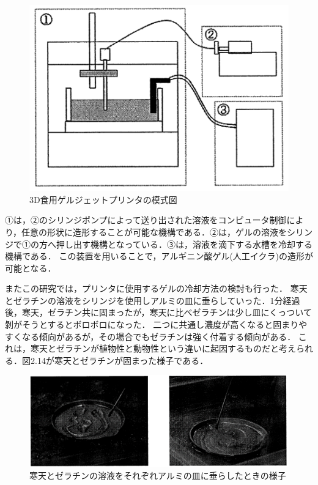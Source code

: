 \begin{figure}[H]
  \centering
  \includegraphics[width=10truecm]{./fig/geru.png}
  \caption{3D食用ゲルジェットプリンタの模式図}
  \label{fig:ferret}
\end{figure}

①は，②のシリンジポンプによって送り出された溶液をコンピュータ制御により，任意の形状に造形することが可能な機構である．②は，ゲルの溶液をシリンジで①の方へ押し出す機構となっている．③は，溶液を滴下する水槽を冷却する機構である．
この装置を用いることで，アルギニン酸ゲル(人工イクラ)の造形が可能となる．

またこの研究では，プリンタに使用するゲルの冷却方法の検討も行った．
寒天とゼラチンの溶液をシリンジを使用しアルミの皿に垂らしていった．1分経過後，寒天，ゼラチン共に固まったが，寒天に比べゼラチンは少し皿にくっついて剝がそうとするとボロボロになった．
二つに共通し濃度が高くなると固まりやすくなる傾向があるが，その場合でもゼラチンは強く付着する傾向がある．
これは，寒天とゼラチンが植物性と動物性という違いに起因するものだと考えられる．図2.14が寒天とゼラチンが固まった様子である．

\begin{figure}[H]
  \centering
  \includegraphics[width=12truecm]{./fig/geru2.png}
  \caption{寒天とゼラチンの溶液をそれぞれアルミの皿に垂らしたときの様子}
  \label{fig:ferret}
\end{figure}

